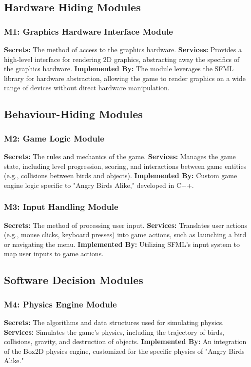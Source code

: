 \documentclass[12pt]{article}
\begin{document}
\subsection{Hardware Hiding Modules}

\subsubsection{M1: Graphics Hardware Interface Module}
\textbf{Secrets:} The method of access to the graphics hardware.
\textbf{Services:} Provides a high-level interface for rendering 2D graphics, abstracting away the specifics of the graphics hardware.
\textbf{Implemented By:} The module leverages the SFML library for hardware abstraction, allowing the game to render graphics on a wide range of devices without direct hardware manipulation.

\subsection{Behaviour-Hiding Modules}

\subsubsection{M2: Game Logic Module}
\textbf{Secrets:} The rules and mechanics of the game.
\textbf{Services:} Manages the game state, including level progression, scoring, and interactions between game entities (e.g., collisions between birds and objects).
\textbf{Implemented By:} Custom game engine logic specific to "Angry Birds Alike," developed in C++.

\subsubsection{M3: Input Handling Module}
\textbf{Secrets:} The method of processing user input.
\textbf{Services:} Translates user actions (e.g., mouse clicks, keyboard presses) into game actions, such as launching a bird or navigating the menu.
\textbf{Implemented By:} Utilizing SFML's input system to map user inputs to game actions.

\subsection{Software Decision Modules}

\subsubsection{M4: Physics Engine Module}
\textbf{Secrets:} The algorithms and data structures used for simulating physics.
\textbf{Services:} Simulates the game's physics, including the trajectory of birds, collisions, gravity, and destruction of objects.
\textbf{Implemented By:} An integration of the Box2D physics engine, customized for the specific physics of "Angry Birds Alike."
\end{document}
